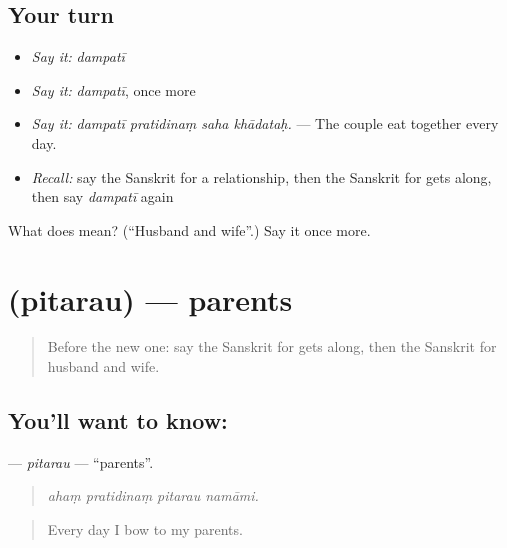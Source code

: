 \subsection*{Your turn}
\begin{itemize}
\raggedright
  \item \emph{Say it:} \emph{dampatī}
  \item \emph{Say it:} \emph{dampatī}, once more
  \item \emph{Say it:} \emph{dampatī pratidinaṃ saha khādataḥ.} — The couple eat together every day.
  \item \emph{Recall:} say the Sanskrit for a relationship, then the Sanskrit for gets along, then say \emph{dampatī} again
\end{itemize}

\begin{tcolorbox}[breakable,colback=teal!4,colframe=teal!35!black,title={Before you move on}]
What does  mean? (\textquotedblleft{}Husband and wife\textquotedblright{}.) Say it once more.
\end{tcolorbox}
\section[\texorpdfstring{\sk{पितरौ} (pitarau)}{पितरौ (pitarau)}]{ (pitarau) — parents}

\label{lesson:SA-C501-pitarau}



\begin{quote}
Before the new one: say the Sanskrit for gets along, then the Sanskrit for husband and wife.
\end{quote}

\subsection*{You'll want to know: }
\textbf{} — \emph{pitarau} — \textquotedblleft{}parents\textquotedblright{}.

\begin{quote}
   
\end{quote}

\begin{quote}
\emph{ahaṃ pratidinaṃ pitarau namāmi.}
\end{quote}

\begin{quote}
Every day I bow to my parents.
\end{quote}

